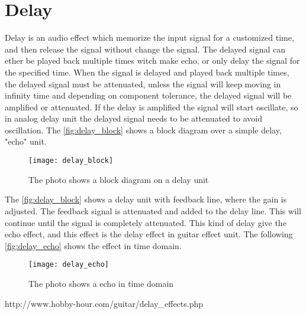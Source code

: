 \section{Delay}
Delay is an audio effect which memorize the input signal for a customized time, and then release the signal without change the signal. The delayed signal can ether be played back multiple times witch make echo, or only delay the signal for the specified time. When the signal is delayed and played back multiple times, the delayed signal must be attenuated, unless the signal will keep moving in infinity time and depending on component tolerance, the delayed signal will be amplified or attenuated. If the delay is amplified the signal will start oscillate, so in analog delay unit the delayed signal needs to be attenuated to avoid oscillation. The \autoref{fig:delay_block} shows a block diagram over a simple delay, "echo" unit.


\begin{figure} [htbp]
 \centering
  \texttt{[image: delay\_block]}
  \caption{The photo shows a block diagram on a delay unit}
  \label{fig:delay_block}
\end{figure}

The \autoref{fig:delay_block} shows a delay unit with feedback line, where the gain is adjusted. The feedback signal is attenuated and added to the delay line. This will continue until the signal is completely attenuated. This kind of delay give the echo effect, and this effect is the delay effect in guitar effect unit. The following \autoref{fig:delay_echo} shows the effect in time domain.

\begin{figure} [htbp]
 \centering
  \texttt{[image: delay\_echo]}
  \caption{The photo shows a echo in time domain}
  \label{fig:delay_block}
\end{figure}

http://www.hobby-hour.com/guitar/delay_effects.php